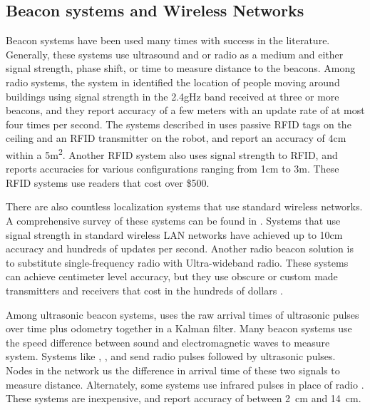 \documentclass{article}
\begin{document}
  \subsection{Beacon systems and Wireless Networks}

    Beacon systems have been used many times with success in the literature. Generally, these systems use ultrasound and or radio as a medium and either signal strength, phase shift, or time to measure distance to the beacons. Among radio systems, the system in \cite{bahl_radar:_2000} identified the location of people moving around buildings using signal strength in the 2.4gHz band received at three or more beacons, and they report accuracy of a few meters with an update rate of at most four times per second. The systems described in \cite{digiampaolo_mobile_2014} uses passive RFID tags on the ceiling and an RFID transmitter on the robot, and report an accuracy of 4\si{\centi\meter} within a 5\si{\square\meter}. Another RFID system \cite{saab_standalone_2011} also uses signal strength to RFID, and reports accuracies for various configurations ranging from 1\si{\centi\meter} to 3\si{\meter}. These RFID systems use readers that cost over \$500.

    There are also countless localization systems that use standard wireless networks. A comprehensive survey of these systems can be found in \cite{liu_survey_2007}. Systems that use signal strength in standard wireless LAN networks have achieved up to 10\si{\centi\meter} accuracy and hundreds of updates per second. Another radio beacon solution is to substitute single-frequency radio with Ultra-wideband radio. These systems can achieve centimeter level accuracy, but they use obscure or custom made transmitters and receivers that cost in the hundreds of dollars \cite{zebra_dart_nodate} \cite{pozyx_pozyx_nodate}.

    Among ultrasonic beacon systems, \cite{kleeman_optimal_1992} uses the raw arrival times of ultrasonic pulses over time plus odometry together in a Kalman filter. Many beacon systems use the speed difference between sound and electromagnetic waves to measure system. Systems like \cite{smith_tracking_2004}, \cite{ward_new_1997}, and \cite{kim_advanced_2008} send radio pulses followed by ultrasonic pulses. Nodes in the network us the difference in arrival time of these two signals to measure distance. Alternately, some systems use infrared pulses in place of radio \cite{ghidary_new_1999} \cite{yucel_development_2012}. These systems are inexpensive, and report accuracy of between \SI{2}{\centi\meter} and \SI{14}{\centi\meter}.
\end{document}
